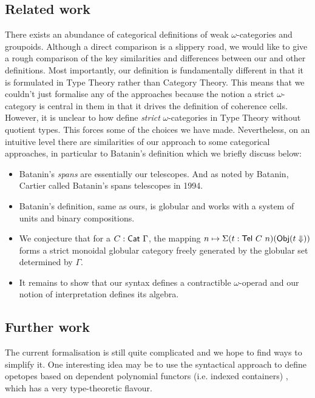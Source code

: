 \subsection{Related work}
There exists an abundance of categorical definitions of weak
$\omega$-categories and groupoids.  Although a direct comparison is a
slippery road, we would like to give a rough comparison of the key
similarities and differences between our and other definitions. Most
importantly, our definition is fundamentally different in that it is
formulated in Type Theory rather than Category Theory. This means that
we couldn't just formalise any of the approaches
\cite{penon:1999,batanin98:monoidal-globular,leinster:2000} because
the notion a strict $\omega$-category is central in them in that it
drives the definition of coherence cells. However, it is unclear to how define
\emph{strict} $\omega$-categories in Type Theory
without quotient types. This forces some of the choices we have
made. Nevertheless, on an intuitive level there are similarities of
our approach to some 
categorical approaches, in particular to Batanin's definition
\cite{batanin98:monoidal-globular} which we briefly discuss below:  
\begin{itemize}
\item Batanin's \emph{spans} are essentially our telescopes. And as
  noted by Batanin, Cartier called Batanin's spans telescopes in
  1994. 
\item Batanin's definition, same as ours, is globular and works with a system of
  units and binary compositions. 
\item We conjecture that for a $C : \mathsf{Cat}~\Gamma$, the mapping 
  $n \mapsto \Sigma(t : \mathsf{Tel}~C~n) (\mathsf{Obj} (t \Downarrow))$
  forms a strict monoidal globular category freely generated by the
  globular set determined by $\Gamma$. 
\item It remains to show that our syntax defines a contractible
  $\omega$-operad and our notion of interpretation defines its
  algebra.
\end{itemize}
%



\subsection{Further work}
The current formalisation is still
quite complicated and we hope to find ways to simplify it. One interesting
idea may be to use the syntactical approach to define opetopes based on
dependent polynomial functors (i.e. indexed containers) \cite{opetopes},
which has a very type-theoretic flavour.  

